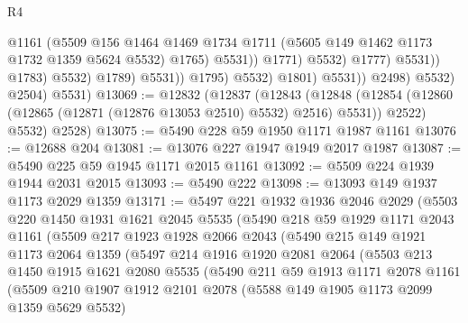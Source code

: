 \begin{lexlean}{R4}
\begin{coremodule}
                                              @1161
                                              (@5509
                                                @156
                                                @1464
                                                @1469
                                                @1734
                                                @1711
                                                (@5605 @149 @1462 @1173 @1732 @1359 @5624 @5532)
                                                @1765)
                                              @5531))
                                          @1771)
                                        @5532)
                                      @1777)
                                    @5531))
                                @1783)
                              @5532)
                            @1789)
                          @5531))
                      @1795)
                    @5532)
                  @1801)
                @5531))
            @2498)
          @5532)
        @2504)
      @5531)
@13069 := @12832
    (@12837
      (@12843
        (@12848 (@12854 (@12860 (@12865 (@12871 (@12876 @13053 @2510) @5532) @2516) @5531)) @2522)
        @5532)
      @2528)
@13075 := @5490 @228 @59 @1950 @1171 @1987 @1161
@13076 := @12688 @204
@13081 := @13076 @227 @1947 @1949 @2017 @1987
@13087 := @5490 @225 @59 @1945 @1171 @2015 @1161
@13092 := @5509 @224 @1939 @1944 @2031 @2015
@13093 := @5490 @222
@13098 := @13093 @149 @1937 @1173 @2029 @1359
@13171 := @5497
    @221
    @1932
    @1936
    @2046
    @2029
    (@5503
      @220
      @1450
      @1931
      @1621
      @2045
      @5535
      (@5490
        @218
        @59
        @1929
        @1171
        @2043
        @1161
        (@5509
          @217
          @1923
          @1928
          @2066
          @2043
          (@5490
            @215
            @149
            @1921
            @1173
            @2064
            @1359
            (@5497
              @214
              @1916
              @1920
              @2081
              @2064
              (@5503
                @213
                @1450
                @1915
                @1621
                @2080
                @5535
                (@5490
                  @211
                  @59
                  @1913
                  @1171
                  @2078
                  @1161
                  (@5509
                    @210
                    @1907
                    @1912
                    @2101
                    @2078
                    (@5588 @149 @1905 @1173 @2099 @1359 @5629 @5532)

\end{coremodule}
\end{lexlean}
